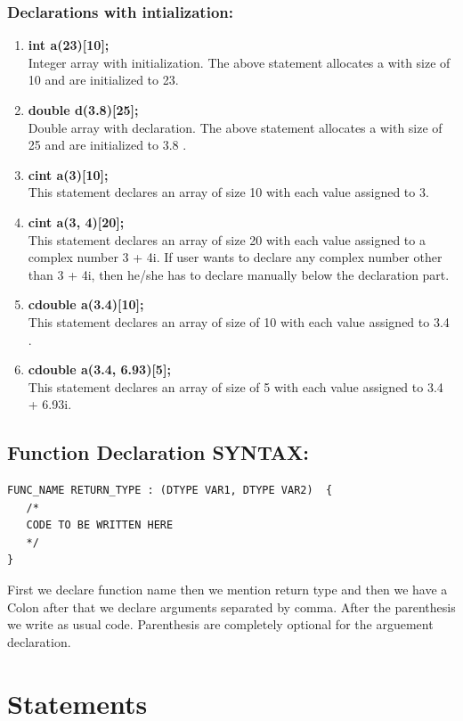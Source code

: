 \documentclass[12pt]{article}
\begin{document}
\subsubsection{Declarations with intialization:} 
\begin{enumerate}
    \item \textbf{int a(23)[10];} \\
    Integer array with initialization.
    The above statement allocates a with size of 10 and are initialized to 23.
    \item \textbf{double d(3.8)[25]; } \\
    Double array with declaration.
    The above statement allocates a with size of 25 and are initialized to 3.8 .
    \item \textbf{cint a(3)[10];} \\
    This statement declares an array of size 10 with each value assigned to 3.
         \item  \textbf{cint a(3, 4)[20];}\\ 
    This statement declares an array of size 20 with each value assigned to a complex number 3 + 4i. If user wants to declare any complex number other 
    than 3 + 4i, then he/she has to declare manually below the declaration part.
    \item \textbf{cdouble a(3.4)[10];} \\
    This statement declares an array of size of 10 with each value assigned to 3.4 .
    \item \textbf{cdouble a(3.4, 6.93)[5];} \\
    This statement declares an array of size of 5 with each value assigned to 3.4 + 6.93i. 
\end{enumerate}

\subsection{Function Declaration SYNTAX:}
    \begin{BVerbatim} 
FUNC_NAME RETURN_TYPE : (DTYPE VAR1, DTYPE VAR2)  {
   /*
   CODE TO BE WRITTEN HERE
   */
}
    \end{BVerbatim}

First we declare function name then we mention return type and then we have a Colon after that we declare arguments separated by comma. After the parenthesis we write as usual code. Parenthesis are completely optional for the arguement declaration.


\section{Statements}
\end{document}
